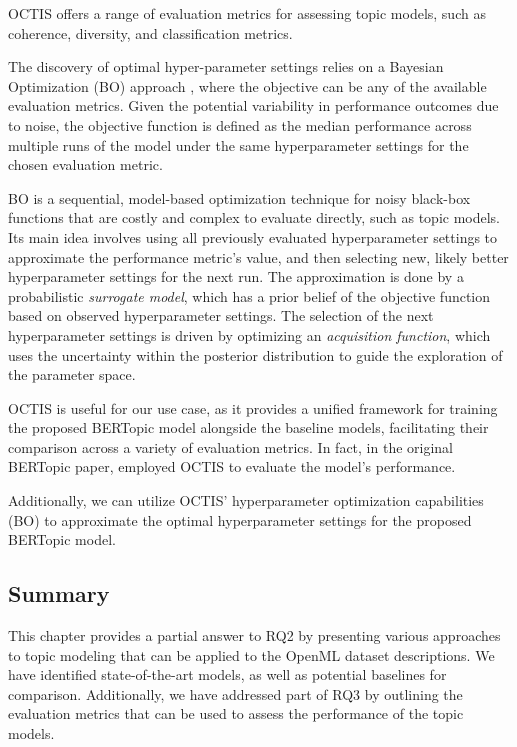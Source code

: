 OCTIS offers a range of evaluation metrics for assessing topic models, such as coherence, diversity, and classification metrics.

The discovery of optimal hyper-parameter settings relies on a Bayesian Optimization (BO) approach \cite{archetti_bayesian_2019, galuzzi_hyperparameter_2020, snoek_practical_2012}, where the objective can be any of the available evaluation metrics. Given the potential variability in performance outcomes due to noise, the objective function is defined as the median performance across multiple runs of the model under the same hyperparameter settings for the chosen evaluation metric.

BO is a sequential, model-based optimization technique for noisy black-box functions that are costly and complex to evaluate directly, such as topic models. Its main idea involves using all previously evaluated hyperparameter settings to approximate the performance metric's value, and then selecting new, likely better hyperparameter settings for the next run. The approximation is done by a probabilistic \textit{surrogate model}, which has a prior belief of the objective function based on observed hyperparameter settings. The selection of the next hyperparameter settings is driven by optimizing an \textit{acquisition function}, which uses the uncertainty within the posterior distribution to guide the exploration of the parameter space.

OCTIS is useful for our use case, as it provides a unified framework for training the proposed BERTopic model alongside the baseline models, facilitating their comparison across a variety of evaluation metrics. In fact, in the original BERTopic paper, \citet{grootendorst_bertopic_2022} employed OCTIS to evaluate the model's performance.

Additionally, we can utilize OCTIS' hyperparameter optimization capabilities (BO) to approximate the optimal hyperparameter settings for the proposed BERTopic model.

\subsection{Summary}
This chapter provides a partial answer to RQ2 by presenting various approaches to topic modeling that can be applied to the OpenML dataset descriptions. We have identified state-of-the-art models, as well as potential baselines for comparison. Additionally, we have addressed part of RQ3 by outlining the evaluation metrics that can be used to assess the performance of the topic models.